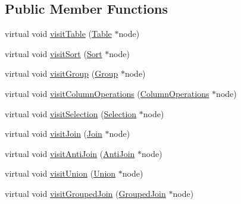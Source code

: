 \subsection*{Public Member Functions}
\begin{DoxyCompactItemize}
\item 
virtual void \hyperlink{classrafe_1_1_algebra_visitor_a941798202c3a94d5b9884edc875ea88e}{visit\+Table} (\hyperlink{classrafe_1_1_table}{Table} $\ast$node)
\item 
virtual void \hyperlink{classrafe_1_1_algebra_visitor_a836e2efd8ac77071ad2487f9a5ae772d}{visit\+Sort} (\hyperlink{classrafe_1_1_sort}{Sort} $\ast$node)
\item 
virtual void \hyperlink{classrafe_1_1_algebra_visitor_a976d80987756215e71178f4c1863c6c7}{visit\+Group} (\hyperlink{classrafe_1_1_group}{Group} $\ast$node)
\item 
virtual void \hyperlink{classrafe_1_1_algebra_visitor_a518ce4d12f874a6c2f1fb0bb961144f8}{visit\+Column\+Operations} (\hyperlink{classrafe_1_1_column_operations}{Column\+Operations} $\ast$node)
\item 
virtual void \hyperlink{classrafe_1_1_algebra_visitor_a81f691749cb29da00bee299c617b9044}{visit\+Selection} (\hyperlink{classrafe_1_1_selection}{Selection} $\ast$node)
\item 
virtual void \hyperlink{classrafe_1_1_algebra_visitor_ab499694bc7ccd718c6f7a5c4f3d33f1c}{visit\+Join} (\hyperlink{classrafe_1_1_join}{Join} $\ast$node)
\item 
virtual void \hyperlink{classrafe_1_1_algebra_visitor_a8b31789473135aff92e900a6a7765eda}{visit\+Anti\+Join} (\hyperlink{classrafe_1_1_anti_join}{Anti\+Join} $\ast$node)
\item 
virtual void \hyperlink{classrafe_1_1_algebra_visitor_a1f8a7cae040f5918e562741a136bb096}{visit\+Union} (\hyperlink{classrafe_1_1_union}{Union} $\ast$node)
\item 
virtual void \hyperlink{classrafe_1_1_algebra_visitor_a0715ce3279fa1edc6e472667e7739b57}{visit\+Grouped\+Join} (\hyperlink{classrafe_1_1_grouped_join}{Grouped\+Join} $\ast$node)
\end{DoxyCompactItemize}
